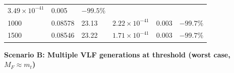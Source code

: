 \documentclass[
  11pt,
]{article}
\begin{document}
\begin{longtable}[]{@{}llllll@{}}
\begin{minipage}[t]{0.14\columnwidth}
\(3.49 \times 10^{-41}\)\strut
\end{minipage} & \begin{minipage}[t]{0.14\columnwidth}\raggedright
0.005\strut
\end{minipage} & \begin{minipage}[t]{0.14\columnwidth}\raggedright
\(-99.5\%\)\strut
\end{minipage}\tabularnewline
\begin{minipage}[t]{0.14\columnwidth}\raggedright
1000\strut
\end{minipage} & \begin{minipage}[t]{0.14\columnwidth}\raggedright
0.08578\strut
\end{minipage} & \begin{minipage}[t]{0.14\columnwidth}\raggedright
23.13\strut
\end{minipage} & \begin{minipage}[t]{0.14\columnwidth}\raggedright
\(2.22 \times 10^{-41}\)\strut
\end{minipage} & \begin{minipage}[t]{0.14\columnwidth}\raggedright
0.003\strut
\end{minipage} & \begin{minipage}[t]{0.14\columnwidth}\raggedright
\(-99.7\%\)\strut
\end{minipage}\tabularnewline
\begin{minipage}[t]{0.14\columnwidth}\raggedright
1500\strut
\end{minipage} & \begin{minipage}[t]{0.14\columnwidth}\raggedright
0.08546\strut
\end{minipage} & \begin{minipage}[t]{0.14\columnwidth}\raggedright
23.22\strut
\end{minipage} & \begin{minipage}[t]{0.14\columnwidth}\raggedright
\(1.71 \times 10^{-41}\)\strut
\end{minipage} & \begin{minipage}[t]{0.14\columnwidth}\raggedright
0.003\strut
\end{minipage} & \begin{minipage}[t]{0.14\columnwidth}\raggedright
\(-99.7\%\)\strut
\end{minipage}\tabularnewline
\bottomrule
\end{longtable}

\textbf{Scenario B: Multiple VLF generations at threshold (worst case,
\(M_F \approx m_t\))}
\end{document}
